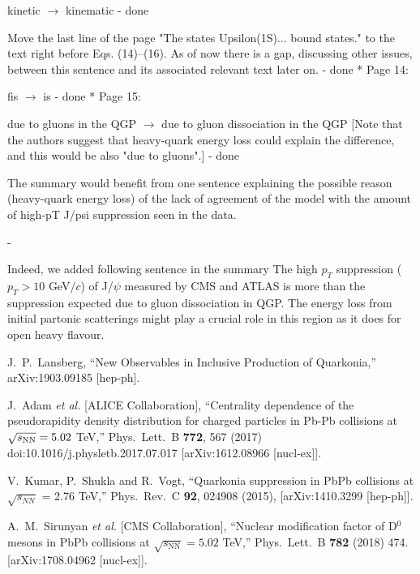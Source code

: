 \documentclass[a4paper,11pt]{article}
\begin{document}
kinetic $\rightarrow$ kinematic 
- {\color{blue} done}\newline

Move the last line of the page "The states Upsilon(1S)... bound states." to 
the text right before Eqs. (14)--(16). As of now there is a gap, discussing 
other issues, between this sentence and its associated relevant text later on. 
- {\color{blue} done}\newline
* Page 14: 

fis $\rightarrow$ is 
- {\color{blue} done}\newline
* Page 15: 

due to gluons in the QGP $\rightarrow$ due to gluon dissociation in the QGP 
[Note that the authors suggest that heavy-quark energy loss could explain 
the difference, and this would be also "due to gluons".]
- {\color{blue} done}\newline

The summary would benefit from one sentence explaining the possible reason 
(heavy-quark energy loss) of the lack of agreement of the model with 
the amount of high-pT J/psi suppression seen in the data. \newline

- {\color{blue} 
Indeed, we added following sentence in the summary
The high $p_T$ suppression ($p_T > 10$  GeV/$c$) of J/$\psi$ measured by CMS and ATLAS is more
than the suppression expected due to gluon dissociation in QGP.
The energy loss from initial partonic scatterings might play a crucial role in this region
as it does for open heavy flavour.

}

\noindent
\begin{thebibliography}{100}
\medskip
  J.~P.~Lansberg,
  ``New Observables in Inclusive Production of Quarkonia,''
  arXiv:1903.09185 [hep-ph].
  
  J.~Adam {\it et al.} [ALICE Collaboration],
  ``Centrality dependence of the pseudorapidity density distribution for charged particles
  in Pb-Pb collisions at $\sqrt{s_{\rm NN}}=5.02$ TeV,''
  Phys.\ Lett.\ B {\bf 772}, 567 (2017)
  doi:10.1016/j.physletb.2017.07.017
  [arXiv:1612.08966 [nucl-ex]].


  V.~Kumar, P.~Shukla and R.~Vogt,
  ``Quarkonia suppression in PbPb collisions at $\sqrt{s_{NN}}$ = 2.76 TeV,''
  Phys.\ Rev.\ C {\bf 92}, 024908 (2015),
  [arXiv:1410.3299 [hep-ph]].


  
  A.~M.~Sirunyan {\it et al.} [CMS Collaboration],
  ``Nuclear modification factor of D$^0$ mesons in PbPb collisions at  $\sqrt{s_\mathrm{NN}} = 5.02$ TeV,''
  Phys.\ Lett.\ B {\bf 782} (2018) 474.  [arXiv:1708.04962 [nucl-ex]].



  
\end{thebibliography}
\end{document}
